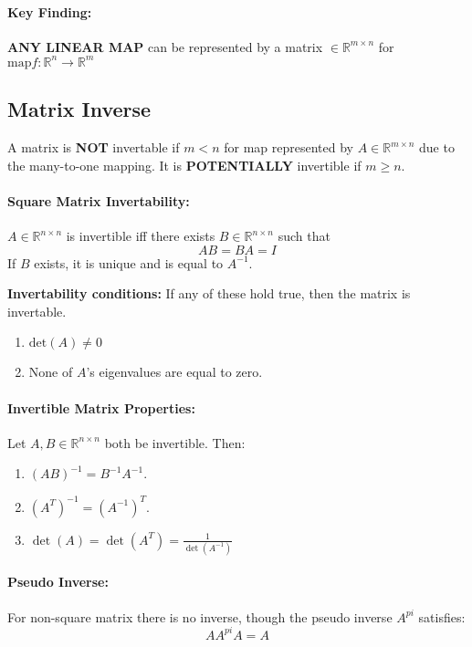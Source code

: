 \documentclass[a4paper,12pt]{report}
\def\reals{\mathbb{R}}
\begin{document}
\paragraph{Key Finding: } \textbf{ANY LINEAR MAP} can be represented by a matrix $\in \reals^{m\times n}$ for $\text{map} f : \reals^n \to \reals^m$

\subsection{Matrix Inverse}

A matrix is \textbf{NOT} invertable if $m < n$ for map represented by $A \in \reals^{m\times n}$ due to the many-to-one mapping. It is \textbf{POTENTIALLY} invertible if $m \geq n$.

\paragraph{Square Matrix Invertability: } $A\in\reals^{n\times n}$ is invertible iff there exists $B\in\reals^{n\times n}$ such that \begin{equation}
AB = BA = I
\end{equation}
If $B$ exists, it is unique and is equal to $A^{-1}$.


\textbf{Invertability conditions: } If any of these hold true, then the matrix is invertable.
\begin{enumerate}
\item $\text{det}(A) \neq 0$
\item None of $A$'s eigenvalues are equal to zero.
\end{enumerate}

\paragraph{Invertible Matrix Properties: } Let $A, B \in \reals^{n\times n}$ both be invertible. Then: 
\begin{enumerate}
\item $(AB)^{-1} = B^{-1} A^{-1}$.
\item $(A^T)^{-1} = (A^{-1})^T$.
\item $\det(A) = \det(A^T) = \frac{1}{\det(A^{-1})}$
\end{enumerate}

\paragraph{Pseudo Inverse: } For non-square matrix there is no inverse, though the pseudo inverse $A^{pi}$ satisfies: 
\begin{equation}
AA^{pi}A = A
\end{equation}
\end{document}

